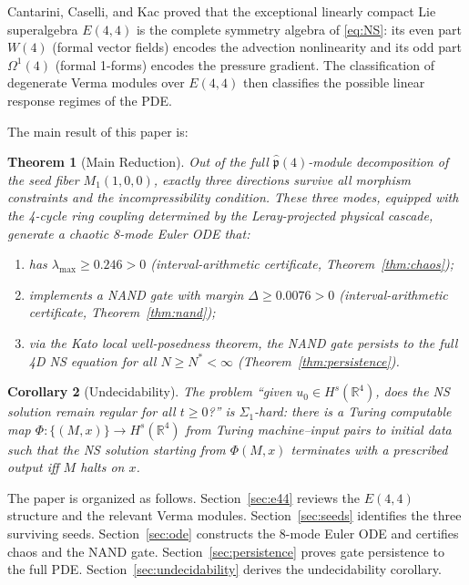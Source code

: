 \documentclass[reqno,10pt]{amsart}
\theoremstyle{plain}
\newtheorem{theorem}{Theorem}[section]
\newtheorem{corollary}[theorem]{Corollary}
\theoremstyle{definition}
\def\RR{{\mathbb{R}}}
\def\phat{\hat{\mathfrak{p}}}
\def\gE{E(4,4)}
\begin{document}
Cantarini, Caselli, and Kac \cite{CCK2026} proved that the exceptional
linearly compact Lie superalgebra $\gE$ is the complete symmetry algebra
of \eqref{eq:NS}: its even part $W(4)$ (formal vector fields) encodes
the advection nonlinearity and its odd part $\Omega^1(4)$ (formal 1-forms)
encodes the pressure gradient.  The classification of degenerate Verma
modules over $\gE$ then classifies the possible linear response regimes
of the PDE.

\medskip

The main result of this paper is:

\begin{theorem}[Main Reduction]\label{thm:main}
  Out of the full $\phat(4)$-module decomposition of the seed fiber
  $M_1(1,0,0)$, exactly three directions survive all morphism constraints
  and the incompressibility condition.  These three modes, equipped with
  the 4-cycle ring coupling determined by the Leray-projected physical cascade,
  generate a chaotic 8-mode Euler ODE that:
  \begin{enumerate}
    \item[\rm(i)] has $\lambda_{\max} \geq 0.246 > 0$
          (interval-arithmetic certificate, Theorem~\ref{thm:chaos});
    \item[\rm(ii)] implements a NAND gate with margin $\Delta \geq 0.0076 > 0$
          (interval-arithmetic certificate, Theorem~\ref{thm:nand});
    \item[\rm(iii)] via the Kato local well-posedness theorem, the NAND gate
          persists to the full 4D NS equation for all $N \geq N^* < \infty$
          (Theorem~\ref{thm:persistence}).
  \end{enumerate}
\end{theorem}

\begin{corollary}[Undecidability]\label{cor:undecidable}
  The problem ``given $u_0 \in H^s(\RR^4)$, does the NS solution remain
  regular for all $t \geq 0$?'' is $\Sigma_1$-hard: there is a Turing
  computable map $\Phi: \{(M,x)\} \to H^s(\RR^4)$ from Turing machine--input
  pairs to initial data such that the NS solution starting from $\Phi(M,x)$
  terminates with a prescribed output iff $M$ halts on $x$.
\end{corollary}

The paper is organized as follows.  Section~\ref{sec:e44} reviews the
$\gE$ structure and the relevant Verma modules.  Section~\ref{sec:seeds}
identifies the three surviving seeds.  Section~\ref{sec:ode} constructs
the 8-mode Euler ODE and certifies chaos and the NAND gate.
Section~\ref{sec:persistence} proves gate persistence to the full PDE.
Section~\ref{sec:undecidability} derives the undecidability corollary.
\end{document}
